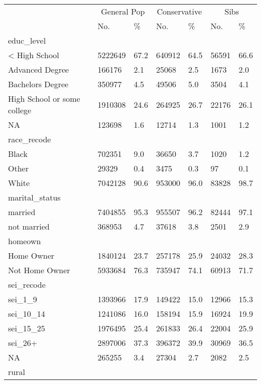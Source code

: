 \captionsetup[table]{labelformat=empty,skip=1pt}
\begin{longtable}{lllllll}
\toprule
& \multicolumn{2}{c}{General Pop} & \multicolumn{2}{c}{Conservative} & \multicolumn{2}{c}{Sibs} \\ 
 \cmidrule(lr){2-3}\cmidrule(lr){4-5}\cmidrule(lr){6-7}
 & No. & \% & No. & \% & No. & \% \\ 
\midrule
\multicolumn{1}{l}{educ\_level} \\ 
\midrule
< High School & 5222649 & 67.2 & 640912 & 64.5 & 56591 & 66.6 \\ 
Advanced Degree & 166176 & 2.1 & 25068 & 2.5 & 1673 & 2.0 \\ 
Bachelors Degree & 350977 & 4.5 & 49506 & 5.0 & 3504 & 4.1 \\ 
High School or some college & 1910308 & 24.6 & 264925 & 26.7 & 22176 & 26.1 \\ 
NA & 123698 & 1.6 & 12714 & 1.3 & 1001 & 1.2 \\ 
\midrule
\multicolumn{1}{l}{race\_recode} \\ 
\midrule
Black & 702351 & 9.0 & 36650 & 3.7 & 1020 & 1.2 \\ 
Other & 29329 & 0.4 & 3475 & 0.3 & 97 & 0.1 \\ 
White & 7042128 & 90.6 & 953000 & 96.0 & 83828 & 98.7 \\ 
\midrule
\multicolumn{1}{l}{marital\_status} \\ 
\midrule
married & 7404855 & 95.3 & 955507 & 96.2 & 82444 & 97.1 \\ 
not married & 368953 & 4.7 & 37618 & 3.8 & 2501 & 2.9 \\ 
\midrule
\multicolumn{1}{l}{homeown} \\ 
\midrule
Home Owner & 1840124 & 23.7 & 257178 & 25.9 & 24032 & 28.3 \\ 
Not Home Owner & 5933684 & 76.3 & 735947 & 74.1 & 60913 & 71.7 \\ 
\midrule
\multicolumn{1}{l}{sei\_recode} \\ 
\midrule
sei\_1\_9 & 1393966 & 17.9 & 149422 & 15.0 & 12966 & 15.3 \\ 
sei\_10\_14 & 1241086 & 16.0 & 158194 & 15.9 & 16924 & 19.9 \\ 
sei\_15\_25 & 1976495 & 25.4 & 261833 & 26.4 & 22004 & 25.9 \\ 
sei\_26+ & 2897006 & 37.3 & 396372 & 39.9 & 30969 & 36.5 \\ 
NA & 265255 & 3.4 & 27304 & 2.7 & 2082 & 2.5 \\ 
\midrule
\multicolumn{1}{l}{rural} \\ 

\end{longtable}
